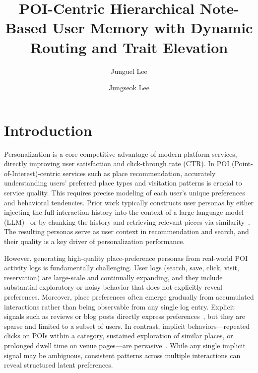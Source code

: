 \documentclass[manuscript,screen,review]{acmart}
\title{POI-Centric Hierarchical Note-Based User Memory with Dynamic Routing and Trait Elevation}
\author{Junguel Lee}
\affiliation{%
  \institution{Naver Corp}
  \country{South Korea}
}
\author{Jungseok Lee}
\affiliation{%
  \institution{Naver Corp}
  \country{South Korea}
}
\begin{document}
\maketitle


\section{Introduction}

Personalization is a core competitive advantage of modern platform services, directly improving user satisfaction and click-through rate (CTR). In POI (Point-of-Interest)-centric services such as place recommendation, accurately understanding users' preferred place types and visitation patterns is crucial to service quality. This requires precise modeling of each user's unique preferences and behavioral tendencies. Prior work typically constructs user personas by either injecting the full interaction history into the context of a large language model (LLM)~\cite{beyond-context-window} or by chunking the history and retrieving relevant pieces via similarity~\cite{dpr,contriever}. The resulting personas serve as user context in recommendation and search, and their quality is a key driver of personalization performance.

However, generating high-quality place-preference personas from real-world POI activity logs is fundamentally challenging. User logs (search, save, click, visit, reservation) are large-scale and continually expanding, and they include substantial exploratory or noisy behavior that does not explicitly reveal preferences. Moreover, place preferences often emerge gradually from accumulated interactions rather than being observable from any single log entry. Explicit signals such as reviews or blog posts directly express preferences~\cite{deeper}, but they are sparse and limited to a subset of users. In contrast, implicit behaviors---repeated clicks on POIs within a category, sustained exploration of similar places, or prolonged dwell time on venue pages---are pervasive~\cite{proex}. While any single implicit signal may be ambiguous, consistent patterns across multiple interactions can reveal structured latent preferences.
\end{document}
